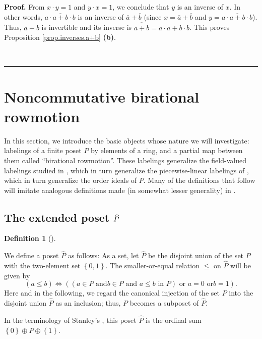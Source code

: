 \documentclass[numbers=enddot,12pt,final,onecolumn,notitlepage]{scrartcl}%
\theoremstyle{definition}
\newtheorem{defi}[theo]{Definition}
\newenvironment{definition}[1][]
{\begin{defi}[#1]\begin{leftbar}}
{\end{leftbar}\end{defi}}
\newenvironment{verlong}{}{}
\newenvironment{proof}[1][Proof]{\noindent\textbf{#1.} }{\ \rule{0.5em}{0.5em}}
\begin{document}
\begin{proof}
\begin{verlong}
From $x\cdot y=1$ and $y\cdot x=1$, we conclude that $y$ is an inverse of $x$.
In other words, $a\cdot\overline{a+b}\cdot b$ is an inverse of $\overline
{a}+\overline{b}$ (since $x=\overline{a}+\overline{b}$ and $y=a\cdot
\overline{a+b}\cdot b$). Thus, $\overline{a}+\overline{b}$ is invertible and
its inverse is $\overline{\overline{a}+\overline{b}}=a\cdot\overline{a+b}\cdot
b$. This proves Proposition \ref{prop.inverses.a+b} \textbf{(b)}. \qedhere

\end{verlong}
\end{proof}

\section{\label{sec.ncbr}Noncommutative birational rowmotion}

In this section, we introduce the basic objects whose nature we will
investigate: labelings of a finite poset $P$ by elements of a ring, and a
partial map between them called \textquotedblleft birational
rowmotion\textquotedblright. These labelings generalize the field-valued
labelings studied in \cite{bir-row-arxiv}, which in turn generalize the
piecewise-linear labelings of \cite{einstein-propp}, which in turn generalize
the order ideals of $P$. Many of the definitions that follow will imitate
analogous definitions made (in somewhat lesser generality) in
\cite{bir-row-arxiv}.

\subsection{The extended poset $\protect\widehat{P}$}

\begin{definition}
\label{def.Phat}We define a poset $\widehat{P}$ as follows: As a set, let
$\widehat{P}$ be the disjoint union of the set $P$ with the two-element set
$\left\{  0,1\right\}  $. The smaller-or-equal relation $\leq$ on
$\widehat{P}$ will be given by%
\[
\left(  a\leq b\right)  \Longleftrightarrow\left(  \left(  a\in P\text{ and
}b\in P\text{ and }a\leq b\text{ in }P\right)  \text{ or }a=0\text{ or
}b=1\right)  .
\]
Here and in the following, we regard the canonical injection of the set $P$
into the disjoint union $\widehat{P}$ as an inclusion; thus, $P$ becomes a
subposet of $\widehat{P}$.
\end{definition}

In the terminology of Stanley's \cite[Section 3.2]{Stanley-EC1}, this poset
$\widehat{P}$ is the ordinal sum $\left\{  0\right\}  \oplus P\oplus\left\{
1\right\}  $.
\end{document}
